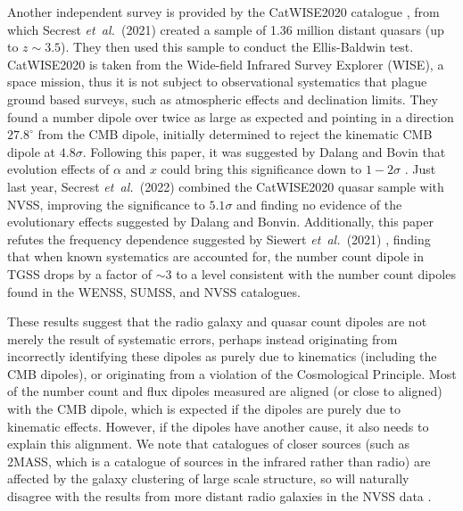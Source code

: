 \documentclass[a4paper,12pt]{report}
\newcommand{\degree}{^\circ}
\newcommand{\etal}{\emph{et~al.\ }}
\begin{document}
Another independent survey is provided by the CatWISE2020 catalogue \cite{RN91}, from which Secrest \etal (2021) \cite{RN31} created a sample of 1.36 million distant quasars (up to $z \sim 3.5$). They then used this sample to conduct the Ellis-Baldwin test. CatWISE2020 is taken from the Wide-field Infrared Survey Explorer (WISE), a space mission, thus it is not subject to observational systematics that plague ground based surveys, such as atmospheric effects and declination limits. They found a number dipole over twice as large as expected and pointing in a direction $27.8\degree$ from the CMB dipole, initially determined to reject the kinematic CMB dipole at $4.8 \sigma$.
Following this paper, it was suggested by Dalang and Bovin that evolution effects of $\alpha$ and $x$ could bring this significance down to $1-2\sigma$ \cite{RN68}. Just last year, Secrest \etal (2022) \cite{RN167} combined the CatWISE2020 quasar sample with NVSS, improving the significance to $5.1 \sigma$ and finding no evidence of the evolutionary effects suggested by Dalang and Bonvin. Additionally, this paper refutes the frequency dependence suggested by Siewert \etal (2021) \cite{RN86}, finding that when known systematics are accounted for, the number count dipole in TGSS drops by a factor of $\sim 3$ to a level consistent with the number count dipoles found in the WENSS, SUMSS, and NVSS catalogues.

These results suggest that the radio galaxy and quasar count dipoles are not merely the result of systematic errors, perhaps instead originating from incorrectly identifying these dipoles as purely due to kinematics (including the CMB dipoles), or originating from a violation of the Cosmological Principle. Most of the number count and flux dipoles measured are aligned (or close to aligned) with the CMB dipole, which is expected if the dipoles are purely due to kinematic effects. However, if the dipoles have another cause, it also needs to explain this alignment.
We note that catalogues of closer sources (such as 2MASS, which is a catalogue of sources in the infrared rather than radio) are affected by the galaxy clustering of large scale structure, so will naturally disagree with the results from more distant radio galaxies in the NVSS data \cite{RN171,RN125,RN173}.
\end{document}

